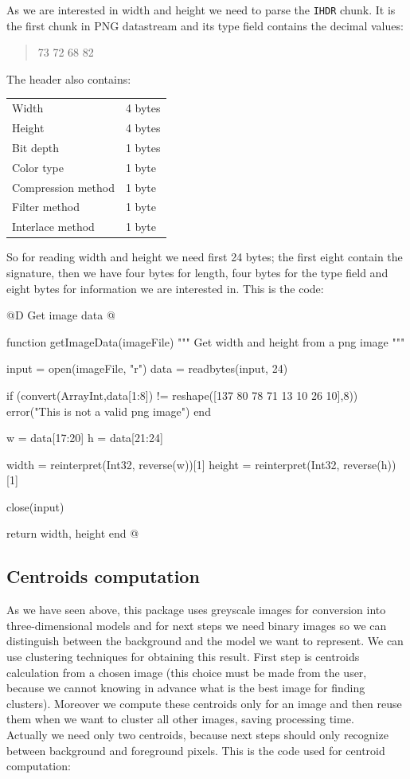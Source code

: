 \documentclass[11pt,oneside]{article}	%
\begin{document}
As we are interested in width and height we need to parse the \texttt{IHDR} chunk. It is the first chunk in PNG datastream and its type field contains the decimal values:

\begin{quote}
 73 72 68 82
\end{quote}

The header also contains:\\

\begin{tabular}{l l}
  Width & 4 bytes\\
  Height & 4 bytes\\
  Bit depth & 1 bytes\\
  Color type & 1 byte\\
  Compression method & 1 byte\\
  Filter method & 1 byte\\
  Interlace method & 1 byte\\
\end{tabular}
\newline

So for reading width and height we need first 24 bytes; the first eight contain the signature, then we have four bytes for length, four bytes for the type field and eight bytes for information we are interested in. This is the code:

@D Get image data
@{function getImageData(imageFile)
  """
  Get width and height from a png image
  """

  input = open(imageFile, "r")
  data = readbytes(input, 24)
  
  if (convert(Array{Int},data[1:8]) != reshape([137 80 78 71 13 10 26 10],8))
    error("This is not a valid png image")
  end

  w = data[17:20]
  h = data[21:24]

  width = reinterpret(Int32, reverse(w))[1]
  height = reinterpret(Int32, reverse(h))[1]

  close(input)

  return width, height
end
@}

\subsection{Centroids computation}\label{sec:centroids}

As we have seen above, this package uses greyscale images for conversion into three-dimensional models and for next steps we need binary images so we can distinguish between the background and the model we want to represent. We can use clustering techniques for obtaining this result. First step is centroids calculation from a chosen image (this choice must be made from the user, because we cannot knowing in advance what is the best image for finding clusters).
Moreover we compute these centroids only for an image and then reuse them when we want to cluster all other images, saving processing time.\\
Actually we need only two centroids, because next steps should only recognize between background and foreground pixels.
This is the code used for centroid computation:
\end{document}
